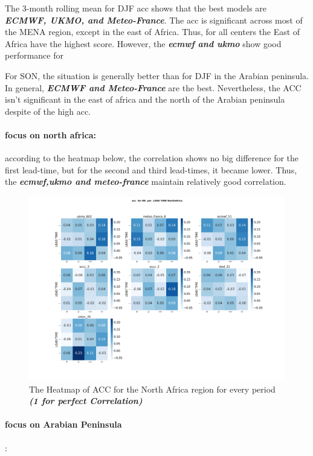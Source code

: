 The 3-month rolling mean for DJF acc shows that the best models are \textbf{\textit{ECMWF, UKMO, and Meteo-France}}. The acc is significant across most of the MENA region, except in the east of Africa. Thus, for all centers the East of Africa have the highest score. However, the \textbf{\textit{ecmwf and ukmo}} show good performance for 


 
For SON, the situation is generally better than for DJF in the Arabian peninsula. In general, \textbf{\textit{ECMWF and Meteo-France}} are the best. Nevertheless, the ACC isn't significant in the east of africa and the north of the Arabian peninsula despite of the high acc.


\paragraph{focus on north africa:}
according to the heatmap below, the correlation shows no big difference for the first lead-time, but for the second and third lead-times, it became lower. Thus, the \textbf{\textit{ecmwf,ukmo and meteo-france}} maintain relatively good correlation.


\begin{figure}[H]
	\centering
	\includegraphics[scale=0.25]{plots/det/acc/acc_RR_NorthAfrica.png}
	\caption{The Heatmap of ACC for the North Africa region for every period \textbf{\textit{(1 for perfect Correlation)} }}
\end{figure}

\vspace{1.5cm}
\paragraph{focus on Arabian Peninsula}:

